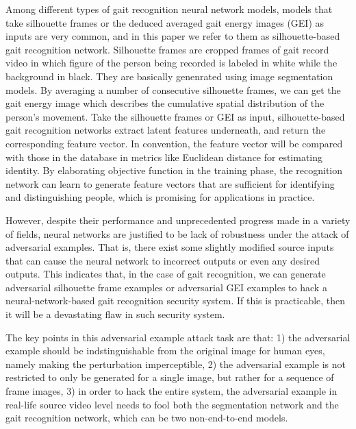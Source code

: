 \documentclass[letterpaper]{article} %
\begin{document}
Among different types of gait recognition neural network models, models that take silhouette frames or the deduced averaged gait energy images (GEI) as inputs are very common, and in this paper we refer to them as silhouette-based gait recognition network. Silhouette frames are cropped frames of gait record video in which figure of the person being recorded is labeled in white while the background in black. They are basically genenrated using image segmentation models. By averaging a number of consecutive silhouette frames, we can get the gait energy image which describes the cumulative spatial distribution of the person's movement. Take the silhouette frames or GEI as input, silhouette-based gait recognition networks extract latent features underneath, and return the corresponding feature vector. In convention, the feature vector will be compared with those in the database in metrics like Euclidean distance for estimating identity. By elaborating objective function in the training phase, the recognition network can learn to generate feature vectors that are sufficient for identifying and distinguishing people, which is promising for applications in practice.

However, despite their performance and unprecedented progress made in a variety of fields, neural networks are justified to be lack of robustness under the attack of adversarial examples. That is, there exist some slightly modified source inputs that can cause the neural network to incorrect outputs or even any desired outputs. This indicates that, in the case of gait recognition, we can generate adversarial silhouette frame examples or adversarial GEI examples to hack a neural-network-based gait recognition security system. If this is practicable, then it will be a devastating flaw in such security system.

The key points in this adversarial example attack task are that: 1) the adversarial example should be indstinguishable from the original image for human eyes, namely making the perturbation imperceptible, 2) the adversarial example is not restricted to only be generated for a single image, but rather for a sequence of frame images, 3) in order to hack the entire system, the adversarial example in real-life source video level needs to fool both the segmentation network and the gait recognition network, which can be two non-end-to-end models.
\end{document}
